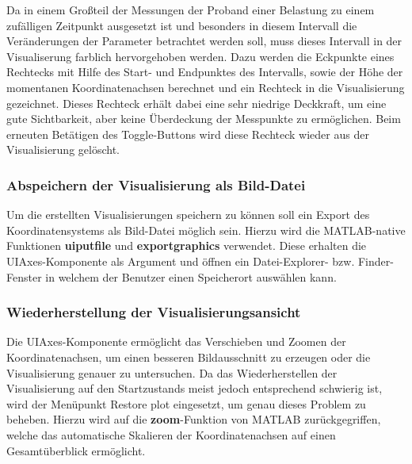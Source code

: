 Da in einem Großteil der Messungen der Proband einer Belastung zu einem zufälligen Zeitpunkt ausgesetzt ist und besonders in diesem Intervall die Veränderungen der Parameter betrachtet werden soll, muss dieses Intervall in der Visualiserung farblich hervorgehoben werden. Dazu werden die Eckpunkte eines Rechtecks mit Hilfe des Start- und Endpunktes des Intervalls, sowie der Höhe der momentanen Koordinatenachsen berechnet und ein Rechteck in die Visualisierung gezeichnet. Dieses Rechteck erhält dabei eine sehr niedrige Deckkraft, um eine gute Sichtbarkeit, aber keine Überdeckung der Messpunkte zu ermöglichen. Beim erneuten Betätigen des Toggle-Buttons wird diese Rechteck wieder aus der Visualisierung gelöscht.


\subsubsection{Abspeichern der Visualisierung als Bild-Datei}

Um die erstellten Visualisierungen speichern zu können soll ein Export des Koordinatensystems als Bild-Datei möglich sein. Hierzu wird die MATLAB-native Funktionen \textbf{uiputfile} und \textbf{exportgraphics} verwendet. Diese erhalten die UIAxes-Komponente als Argument und öffnen ein Datei-Explorer- bzw. Finder-Fenster in welchem der Benutzer einen Speicherort auswählen kann.


\subsubsection{Wiederherstellung der Visualisierungsansicht}

Die UIAxes-Komponente ermöglicht das Verschieben und Zoomen der Koordinatenachsen, um einen besseren Bildausschnitt zu erzeugen oder die Visualisierung genauer zu untersuchen. Da das Wiederherstellen der Visualisierung auf den Startzustands meist jedoch entsprechend schwierig ist, wird der Menüpunkt \glqq Restore plot\grqq{} eingesetzt, um genau dieses Problem zu beheben. Hierzu wird auf die \textbf{zoom}-Funktion von MATLAB zurückgegriffen, welche das automatische Skalieren der Koordinatenachsen auf einen Gesamtüberblick ermöglicht.

